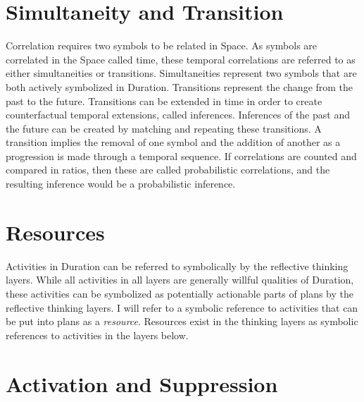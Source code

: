 \section{Simultaneity and Transition}

Correlation requires two symbols to be related in Space.  As symbols
are correlated in the Space called time, these temporal correlations
are referred to as either simultaneities or transitions.
Simultaneities represent two symbols that are both actively symbolized
in Duration.  Transitions represent the change from the past to the
future.  Transitions can be extended in time in order to create
counterfactual temporal extensions, called inferences.  Inferences of
the past and the future can be created by matching and repeating these
transitions.  A transition implies the removal of one symbol and the
addition of another as a progression is made through a temporal
sequence.  If correlations are counted and compared in ratios, then
these are called probabilistic correlations, and the resulting
inference would be a probabilistic inference.

\section{Resources}

Activities in Duration can be referred to symbolically by the
reflective thinking layers.  While all activities in all layers are
generally willful qualities of Duration, these activities can be
symbolized as potentially actionable parts of plans by the reflective
thinking layers.  I will refer to a symbolic reference to activities
that can be put into plans as a \emph{resource}.  Resources exist in
the thinking layers as symbolic references to activities in the layers
below.

\section{Activation and Suppression}

